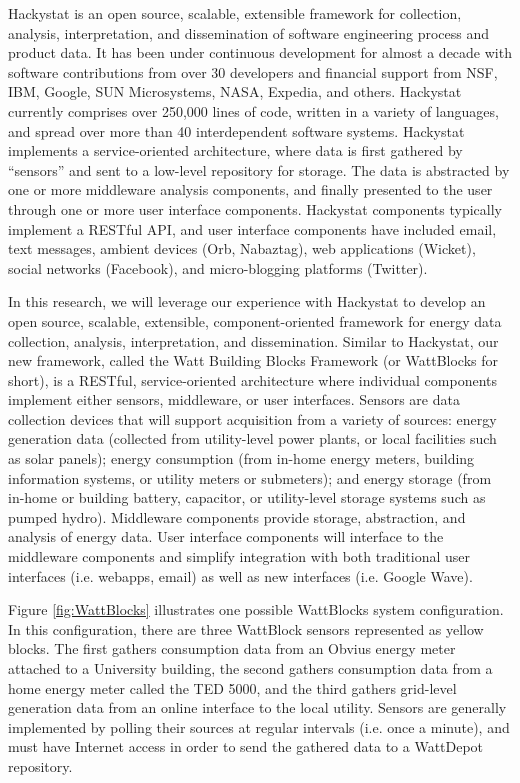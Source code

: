 Hackystat is an open source, scalable, extensible framework for collection,
analysis, interpretation, and dissemination of software engineering process
and product data.  It has been under continuous development for almost a
decade with software contributions from over 30 developers and financial
support from NSF, IBM, Google, SUN Microsystems, NASA, Expedia, and others.  
Hackystat currently comprises over 250,000 lines of code, written
in a variety of languages, and spread over more than 40 interdependent
software systems.  Hackystat implements a service-oriented architecture,
where data is first gathered by ``sensors'' and sent to a low-level
repository for storage.  The data is abstracted by one or more middleware
analysis components, and finally presented to the user through one or more
user interface components.  Hackystat components typically implement a
RESTful API, and user interface components have included email, text
messages, ambient devices (Orb, Nabaztag), web applications (Wicket),
social networks (Facebook), and micro-blogging platforms (Twitter).

In this research, we will leverage our experience with Hackystat to develop
an open source, scalable, extensible, component-oriented framework for
energy data collection, analysis, interpretation, and dissemination.
Similar to Hackystat, our new framework, called the Watt Building Blocks
Framework (or WattBlocks for short), is a RESTful, service-oriented
architecture where individual components implement either sensors,
middleware, or user interfaces.  Sensors are data collection devices that
will support acquisition from a variety of sources: energy generation data
(collected from utility-level power plants, or local facilities such as
solar panels); energy consumption (from in-home energy meters, building
information systems, or utility meters or submeters); and energy storage
(from in-home or building battery, capacitor, or utility-level storage
systems such as pumped hydro).  Middleware components provide storage,
abstraction, and analysis of energy data. User interface components will
interface to the middleware components and simplify integration with both
traditional user interfaces (i.e. webapps, email) as well as new interfaces
(i.e. Google Wave).

Figure \ref{fig:WattBlocks} illustrates one possible WattBlocks system
configuration.  In this configuration, there are three WattBlock sensors
represented as yellow blocks.  The first gathers consumption data from an
Obvius energy meter attached to a University building, the second gathers
consumption data from a home energy meter called the TED 5000, and the
third gathers grid-level generation data from an online interface to the
local utility.  Sensors are generally implemented by polling their sources
at regular intervals (i.e. once a minute), and must have Internet
access in order to send the gathered data to a WattDepot repository.


